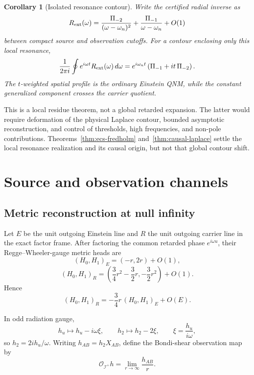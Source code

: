 \documentclass[11pt]{article}
\newtheorem{corollary}[theorem]{Corollary}
\theoremstyle{remark}
\begin{document}
\begin{corollary}[Isolated resonance contour]
\label{cor:isolated-contour}
Write the certified radial inverse as
\[
 R_{\rm ext}(\omega)
 =\frac{\Pi_{-2}}{(\omega-\omega_n)^2}
 +\frac{\Pi_{-1}}{\omega-\omega_n}+O(1)
\]
between compact source and observation cutoffs.  For a contour enclosing
only this local resonance,
\[
 \frac1{2\pi i}\oint
 e^{i\omega t}R_{\rm ext}(\omega)\,d\omega
 =
 e^{i\omega_nt}\left(\Pi_{-1}+it\,\Pi_{-2}\right).
\]
The \(t\)-weighted spatial profile is the ordinary Einstein QNM, while
the constant generalized component crosses the carrier quotient.
\end{corollary}

This is a local residue theorem, not a global retarded expansion.  The
latter would require deformation of the physical Laplace contour, bounded
asymptotic reconstruction, and control of thresholds, high frequencies,
and non-pole contributions.  Theorems~\ref{thm:ecs-fredholm}
and~\ref{thm:causal-laplace} settle the local resonance realization and
its causal origin, but not that global contour shift.

\section{Source and observation channels}
\label{sec:channels}

\subsection{Metric reconstruction at null infinity}

Let \(E\) be the unit outgoing Einstein line and \(R\) the unit outgoing
carrier line in the exact factor frame.  After factoring the common
retarded phase \(e^{i\omega u}\), their Regge--Wheeler-gauge metric heads
are
\[
 (H_0,H_1)_E=(-r,2r)+O(1),
\]
\[
 (H_0,H_1)_R=
 \left(\frac34r^2-\frac32r,-\frac32r^2\right)+O(1).
\]
Hence
\[
 (H_0,H_1)_R=-\frac34r\,(H_0,H_1)_E+O(E).
\]

In odd radiation gauge,
\[
 h_u\mapsto h_u-i\omega\xi,\qquad
 h_2\mapsto h_2-2\xi,\qquad
 \xi=\frac{h_u}{i\omega},
\]
so \(h_2=2ih_u/\omega\).  Writing \(h_{AB}=h_2X_{AB}\), define the
Bondi-shear observation map by
\[
 \mathcal O_{\mathscr I^+}h
 =\lim_{r\to\infty}\frac{h_{AB}}r.
\]
\end{document}
